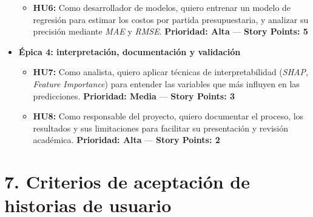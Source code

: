\documentclass[
11pt, %
]{charter}
\begin{document}
\begin{itemize}
\begin{itemize}
      \item \textbf{HU6:} Como desarrollador de modelos, quiero entrenar un modelo de regresión para estimar los costos por partida presupuestaria, y analizar su precisión mediante \textit{MAE} y \textit{RMSE}.  
      \newline \textbf{Prioridad: Alta} — \textbf{Story Points: 5}
    \end{itemize}

  \item \textbf{Épica 4: interpretación, documentación y validación}
    \begin{itemize}
      \item \textbf{HU7:} Como analista, quiero aplicar técnicas de interpretabilidad (\textit{SHAP}, \textit{Feature Importance}) para entender las variables que más influyen en las predicciones.  
      \newline \textbf{Prioridad: Media} — \textbf{Story Points: 3}

      \item \textbf{HU8:} Como responsable del proyecto, quiero documentar el proceso, los resultados y sus limitaciones para facilitar su presentación y revisión académica.  
      \newline \textbf{Prioridad: Alta} — \textbf{Story Points: 2}
    \end{itemize}
\end{itemize}

\section{7. Criterios de aceptación de historias de usuario}
\label{sec:criteriosAceptacion}
\end{document}
